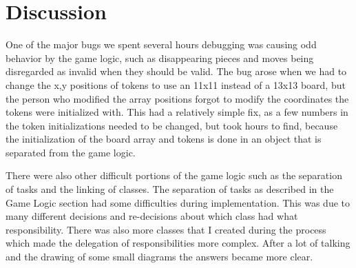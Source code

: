 \documentclass{article}
\begin{document}
\section{Discussion}
	One of the major bugs we spent several hours debugging was causing odd behavior by the game logic, such as disappearing pieces and moves being disregarded as invalid when they should be valid. The bug arose when we had to change the x,y positions of tokens to use an 11x11 instead of a 13x13 board, but the person who modified the array positions forgot to modify the coordinates the tokens were initialized with. This had a relatively simple fix, as a few numbers in the token initializations needed to be changed, but took hours to find, because the initialization of the board array and tokens is done in an object that is separated from the game logic. \par
	There were also other difficult portions of the game logic such as the separation of tasks and the linking of classes. The separation of tasks as described in the Game Logic section had some difficulties during implementation. This was due to many different decisions and re-decisions about which class had what responsibility. There was also more classes that I created during the process which made the delegation of responsibilities more complex. After a lot of talking and the drawing of some small diagrams the answers became more clear.\par
\end{document}
